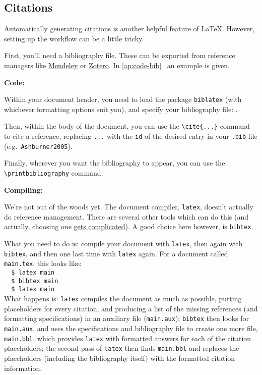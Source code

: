 \subsection{Citations}
Automatically generating citations is another helpful feature of \LaTeX.
However, setting up the workflow can be a little tricky.
\par
First, you'll need a bibliography file. These can be exported from reference managers like
\href{https://mendeley.com}{Mendeley} or
\href{https://www.zotero.org/}{Zotero}.
In \ref{ap:code-bib}~ an example is given.
\par
\textbf{Code:}
\par
Within your document header, you need to load the package \lstinline|biblatex|
(with whichever formatting options suit you),
and specify your bibliography file: \lstinline||.
\par
Then, within the body of the document, you can use the \lstinline|\cite{...}| command to cite a reference,
replacing \lstinline|...| with the \lstinline|id| of the desired entry in your \lstinline|.bib| file
(e.g.\ \lstinline|Ashburner2005|).
\par
Finally, wherever you want the bibliography to appear, you can use the
\lstinline|\printbibliography| command.
\par
\textbf{Compiling:}
\par
We're not out of the woods yet.
The document compiler, \lstinline|latex|, doesn't actually do reference management.
There are several other tools which can do this (and actually, choosing one
\href{https://tex.stackexchange.com/questions/25701/}{gets complicated}).
A good choice here however, is \lstinline|bibtex|.
\par
What you need to do is:
compile your document with \lstinline|latex|,
then again with \lstinline|bibtex|,
and then one last time with \lstinline|latex| again.
For a document called \lstinline|main.tex|, this looks like:\\
\lstinline|  $ latex main|\\
\lstinline|  $ bibtex main|\\
\lstinline|  $ latex main|\\
What happens is:
\lstinline|latex| compiles the document as much as possible,
putting placeholders for every citation,
and producing a list of the missing references (and formatting specifications)
in an auxiliary file (\lstinline|main.aux|);
\lstinline|bibtex| then looks for \lstinline|main.aux|,
and uses the specifications and bibliography file to create one more file, \lstinline|main.bbl|,
which provides \lstinline|latex| with formatted answers for each of the citation placeholders;
the second pass of \lstinline|latex| then finds \lstinline|main.bbl| and replaces
the placeholders (including the bibliography itself) with the formatted citation information.
\par
